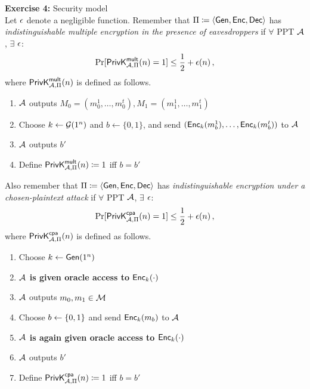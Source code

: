 \documentclass[12pt]{article}
\begin{document}
\textbf{Exercise 4:} Security model\\
Let $\epsilon$ denote a negligible function.
Remember that $\Pi \coloneqq \langle \operatorname{\mathsf{Gen}}, \operatorname{\mathsf{Enc}}, \operatorname{\mathsf{Dec}} \rangle$ has \emph{indistinguishable
multiple encryption in the presence of eavesdroppers} if $\forall$
PPT $\mathcal{A}$, $\exists$ $\epsilon$:
  \[\Pr[\mathsf{PrivK}_{\mathcal{A},\Pi}^\mathsf{mult}(n)=1]\leq\frac12+\epsilon(n) \,,\]
where $\mathsf{PrivK}_{\mathcal{A},\Pi}^\mathsf{mult}(n)$ is defined as follows.
\begin{enumerate}
\item   $\mathcal{A}$ outputs $M_0=(m_0^1,\ldots,m_0^t),
M_1=(m_1^1,\ldots,m_1^t)$
\item Choose $k \leftarrow \mathcal{G}(1^n)$ and $b \leftarrow \{0,1\}$, and send
  $(\operatorname{\mathsf{Enc}}_k(m_b^1),\ldots,\operatorname{\mathsf{Enc}}_k(m_b^t))$ to $\mathcal{A}$
\item $\mathcal{A}$ outputs $b'$
\item Define $\mathsf{PrivK}_{\mathcal{A},\Pi}^\mathsf{mult}(n) \coloneqq 1$ iff $b=b'$
\end{enumerate}

Also remember that $\Pi \coloneqq \langle \operatorname{\mathsf{Gen}}, \operatorname{\mathsf{Enc}}, \operatorname{\mathsf{Dec}} \rangle$ has \emph{indistinguishable
encryption under a chosen-plaintext attack} if $\forall$ PPT $\mathcal{A}$,
$\exists$ $\epsilon$:
  \[\Pr[\mathsf{PrivK}_{\mathcal{A},\Pi}^\mathsf{cpa}(n)=1]\leq\frac12+\epsilon(n) \,,\]
where $\mathsf{PrivK}_{\mathcal{A},\Pi}^\mathsf{cpa}(n)$ is defined as follows.

\begin{enumerate}
  \item Choose $k\leftarrow \operatorname{\mathsf{Gen}}(1^n)$
  \item \textbf{$\mathcal{A}$ is given oracle access to $\operatorname{\mathsf{Enc}}_k(\cdot)$}
  \item $\mathcal{A}$ outputs $m_0, m_1 \in \mathcal{M}$
  \item Choose $b\leftarrow \{0, 1\}$ and send $\operatorname{\mathsf{Enc}}_k(m_b)$ to $\mathcal{A}$
  \item \textbf{$\mathcal{A}$ is again given oracle access to $\operatorname{\mathsf{Enc}}_k(\cdot)$}
  \item $\mathcal{A}$ outputs $b'$
  \item Define $\mathsf{PrivK}_{\mathcal{A},\Pi}^\mathsf{cpa}(n) \coloneqq 1$ iff $b=b'$
\end{enumerate}
\end{document}
